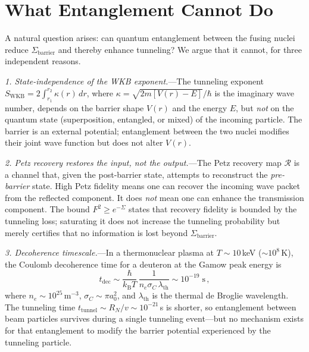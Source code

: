 \documentclass[prc,twocolumn,superscriptaddress,longbibliography,floatfix]{revtex4-2}
\newcommand{\kB}{k_{\mathrm{B}}}
\newcommand{\Petz}{\mathcal{R}}
\newcommand{\Sbar}{\Sigma_{\mathrm{barrier}}}
\begin{document}
\section{What Entanglement Cannot Do}
\label{sec:entanglement}

A natural question arises: can quantum entanglement between the fusing
nuclei reduce $\Sbar$ and thereby enhance tunneling?  We argue that it
cannot, for three independent reasons.

\textit{1. State-independence of the WKB exponent.}---The tunneling
exponent $S_{\mathrm{WKB}} = 2\!\int_{r_{1}}^{r_{2}}\!\kappa(r)\,dr$,
where $\kappa = \sqrt{2m[V(r)-E]}/\hbar$ is the imaginary wave number,
depends on the barrier shape $V(r)$ and the energy $E$, but \emph{not}
on the quantum state (superposition, entangled, or mixed) of the
incoming particle.  The barrier is an external potential; entanglement
between the two nuclei modifies their joint wave function but does not
alter $V(r)$.

\textit{2. Petz recovery restores the input, not the output.}---The
Petz recovery map $\Petz$ is a channel that, given the post-barrier
state, attempts to reconstruct the \emph{pre-barrier} state.  High
Petz fidelity means one can recover the incoming wave packet from
the reflected component.  It does \emph{not} mean one can enhance the
transmission component.  The bound $F^{2}\geq e^{-\Sigma}$ states
that recovery fidelity is bounded by the tunneling loss; saturating
it does not increase the tunneling probability but merely certifies
that no information is lost beyond $\Sbar$.

\textit{3. Decoherence timescale.}---In a thermonuclear plasma at
$T \sim 10\,$keV ($\sim 10^{8}\,$K), the Coulomb decoherence time for
a deuteron at the Gamow peak energy is~\cite{Zurek2003}
\begin{equation}
t_{\mathrm{dec}} \sim \frac{\hbar}{\kB T}\,
\frac{1}{n_{e}\sigma_{C}\,\lambda_{\mathrm{th}}}
\sim 10^{-19}\;\mathrm{s}\,,
\label{eq:decoherence}
\end{equation}
where $n_{e} \sim 10^{25}\,\mathrm{m}^{-3}$,
$\sigma_{C} \sim \pi a_{0}^{2}$, and $\lambda_{\mathrm{th}}$
is the thermal de Broglie wavelength.  The tunneling time
$t_{\mathrm{tunnel}} \sim R_{N}/v \sim 10^{-21}\,$s is shorter,
so entanglement between beam particles survives during a single
tunneling event---but no mechanism exists for that entanglement to
modify the barrier potential experienced by the tunneling particle.
\end{document}
